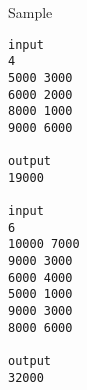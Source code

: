 Sample
\begin{verbatim}
input 
4 
5000 3000 
6000 2000 
8000 1000 
9000 6000 
 
output 
19000 

input 
6 
10000 7000 
9000 3000 
6000 4000 
5000 1000 
9000 3000 
8000 6000 
 
output 
32000 


\end{verbatim}